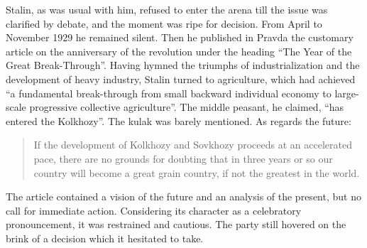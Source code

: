 Stalin, as was usual with him, refused to enter the arena till the issue was clarified by debate, and the moment was ripe for decision. From April to November 1929 he remained silent. Then he published in Pravda the customary article on the anniversary of the revolution under the heading ``The Year of the Great Break-Through''. Having hymned the triumphs of industrialization and the development of heavy industry, Stalin turned to agriculture, which had achieved ``a fundamental break-through from small backward individual economy to large-scale progressive collective agriculture''. The middle peasant, he claimed, ``has entered the Kolkhozy''. The kulak was barely mentioned. As regards the future: 

\begin{quote}
If the development of Kolkhozy and Sovkhozy proceeds at an accelerated pace, there are no grounds for doubting that in three years or so our country will become a great grain country, if not the greatest in the world. 
\end{quote}

The article contained a vision of the future and an analysis of the present, but no call for immediate action. Considering its character as a celebratory pronouncement, it was restrained and cautious. The party still hovered on the brink of a decision which it hesitated to take. 

